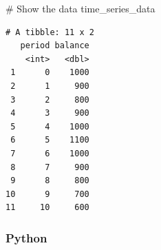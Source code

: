\documentclass[
  letterpaper,
  DIV=11,
  numbers=noendperiod]{scrartcl}
\newenvironment{Shaded}{\begin{snugshade}}{\end{snugshade}}
\newcommand{\CommentTok}[1]{\textcolor[rgb]{0.37,0.37,0.37}{#1}}
\newcommand{\NormalTok}[1]{\textcolor[rgb]{0.00,0.23,0.31}{#1}}
\theoremstyle{definition}
\theoremstyle{remark}
\begin{document}
\begin{Shaded}
\begin{Highlighting}[]
\CommentTok{\# Show the data}
\NormalTok{time\_series\_data}
\end{Highlighting}
\end{Shaded}

\begin{verbatim}
# A tibble: 11 x 2
   period balance
    <int>   <dbl>
 1      0    1000
 2      1     900
 3      2     800
 4      3     900
 5      4    1000
 6      5    1100
 7      6    1000
 8      7     900
 9      8     800
10      9     700
11     10     600
\end{verbatim}

\subsubsection{Python}
\end{document}
